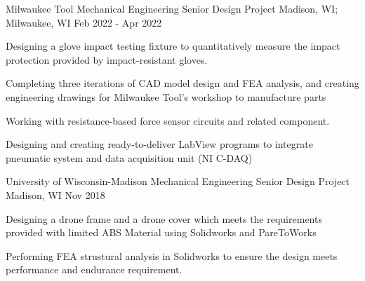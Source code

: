 

\begin{cventries}

  \cventry
    {Milwaukee Tool} %
    {Mechanical Engineering Senior Design Project} %
    {Madison, WI; Milwaukee, WI} %
    {Feb 2022 - Apr 2022} %
    {
      \begin{cvitems} %
        \item {Designing a glove impact testing fixture to quantitatively measure the impact protection provided by impact-resistant gloves.}
        \item {Completing three iterations of CAD model design and FEA analysis, and creating engineering drawings for Milwaukee Tool's workshop to manufacture parts}
        \item {Working with resistance-based force sensor circuits and related component.}
        \item {Designing and creating ready-to-deliver LabView programs to integrate pneumatic system and data acquisition unit (NI C-DAQ)}
      \end{cvitems}
    }


  \cventry
	{University of Wisconsin-Madison} %
	{Mechanical Engineering Senior Design Project} %
	{Madison, WI} %
	{Nov 2018} %
	{
		\begin{cvitems} %
			\item {Designing a drone frame and a drone cover which meets the requirements provided with limited ABS Material using Solidworks and PareToWorks}
			\item {Performing FEA strustural analysis in Solidworks to ensure the design meets performance and endurance requirement. }
		\end{cvitems}
	}




\end{cventries}

